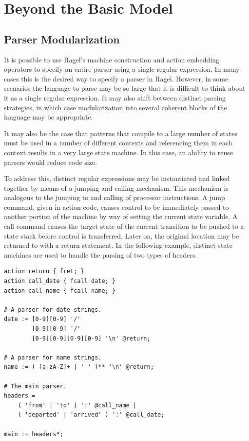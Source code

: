 \documentclass[letterpaper,11pt,oneside]{book}
\newenvironment{inline_code}{\def\baselinestretch{1}\vspace{12pt}\small}{}
\begin{document}
\chapter{Beyond the Basic Model}

\section{Parser Modularization}
\label{modularization}

It is possible to use Ragel's machine construction and action embedding
operators to specify an entire parser using a single regular expression. In
many cases this is the desired way to specify a parser in Ragel. However, in
some scenarios the language to parse may be so large that it is difficult to
think about it as a single regular expression. It may also shift between distinct
parsing strategies, in which case modularization into several coherent blocks
of the language may be appropriate.

It may also be the case that patterns that compile to a large number of states
must be used in a number of different contexts and referencing them in each
context results in a very large state machine. In this case, an ability to reuse
parsers would reduce code size.

To address this, distinct regular expressions may be instantiated and linked
together by means of a jumping and calling mechanism. This mechanism is
analogous to the jumping to and calling of processor instructions. A jump
command, given in action code, causes control to be immediately passed to
another portion of the machine by way of setting the current state variable. A
call command causes the target state of the current transition to be pushed to
a state stack before control is transferred.  Later on, the original location
may be returned to with a return statement. In the following example, distinct
state machines are used to handle the parsing of two types of headers.

\begin{inline_code}
\begin{verbatim}
action return { fret; }
action call_date { fcall date; }
action call_name { fcall name; }

# A parser for date strings.
date := [0-9][0-9] '/' 
        [0-9][0-9] '/' 
        [0-9][0-9][0-9][0-9] '\n' @return;

# A parser for name strings.
name := ( [a-zA-Z]+ | ' ' )** '\n' @return;

# The main parser.
headers = 
    ( 'from' | 'to' ) ':' @call_name | 
    ( 'departed' | 'arrived' ) ':' @call_date;

main := headers*;
\end{verbatim}
\end{inline_code}
\end{document}
